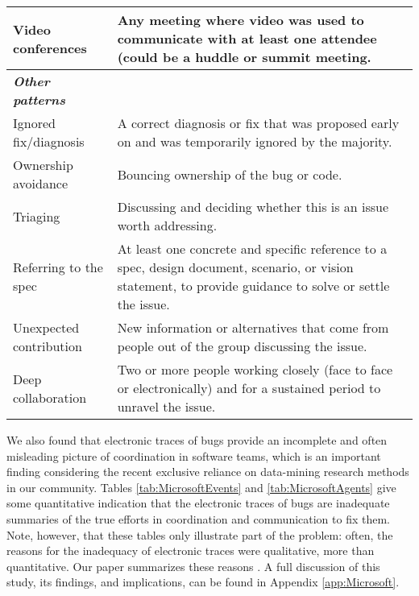 \begin{table}[tbp]
{\begin{tabular}{p{2.4cm}p{12.2cm}}
\hline
\vspace{0.5pt} Video conferences & \vspace{0.5pt} Any meeting where video was used to communicate with at least one attendee (could be a huddle or summit meeting. \\
\hline
\hline
\vspace{1pt} \bfseries \emph{Other patterns} & \vspace{1pt} \\
\hline
\vspace{0.5pt} Ignored fix/diagnosis & \vspace{0.5pt} A correct diagnosis or fix that was proposed early on and was temporarily ignored by the majority. \\
\hline
\vspace{0.5pt} Ownership avoidance & \vspace{0.5pt} Bouncing ownership of the bug or code. \\
\hline
\vspace{0.5pt} Triaging & \vspace{0.5pt} Discussing and deciding whether this is an issue worth addressing. \\
\hline
\vspace{0.5pt} Referring to the spec & \vspace{0.5pt} At least one concrete and specific reference to a spec, design document, scenario, or vision statement, to provide guidance to solve or settle the issue. \\
\hline
\vspace{0.5pt} Unexpected contribution & \vspace{0.5pt} New information or alternatives that come from people out of the group discussing the issue. \\
\hline
\vspace{0.5pt} Deep collaboration & \vspace{0.5pt} Two or more people working closely (face to face or electronically) and for a sustained period to unravel the issue. \\
\hline
\end{tabular}}
\end{table}


We also found that electronic traces of bugs provide an incomplete and often misleading picture of coordination in software teams, which is an important finding considering the recent exclusive reliance on data-mining research methods in our community. Tables \ref{tab:MicrosoftEvents} and \ref{tab:MicrosoftAgents} give some quantitative indication that the electronic traces of bugs are inadequate summaries of the true efforts in coordination and communication to fix them. Note, however, that these tables only illustrate part of the problem: often, the reasons for the inadequacy of electronic traces were qualitative, more than quantitative. Our paper summarizes these reasons \cite{Aranda2009}. A full discussion of this study, its findings, and implications, can be found in Appendix \ref{app:Microsoft}.


